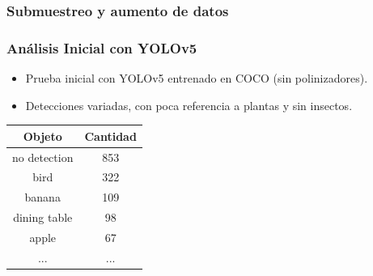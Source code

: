 \begin{frame}
\vspace*{-3mm}
    \begin{center}
    \end{center}
\end{frame}

\begin{frame}
    \begin{center}
    \end{center}
\end{frame}

\begin{frame}
    \frametitle{Submuestreo y aumento de datos}
    \begin{center}
    \end{center}
\end{frame}


\begin{frame}
    \frametitle{Análisis Inicial con YOLOv5}
    \begin{itemize}
        \item Prueba inicial con YOLOv5 entrenado en COCO (sin polinizadores).
        \item Detecciones variadas, con poca referencia a plantas y sin insectos.
    \end{itemize}

    \begin{center}\small
        \begin{tabular}{cc}
            \toprule
            \textbf{Objeto} & \textbf{Cantidad} \\
            \midrule
            no detection &  853 \\
            bird         &  322 \\
            banana       &  109 \\
            dining table &   98 \\
            apple        &   67 \\
            ...          &  ... \\
            \bottomrule
        \end{tabular}
    \end{center}
\end{frame}    


